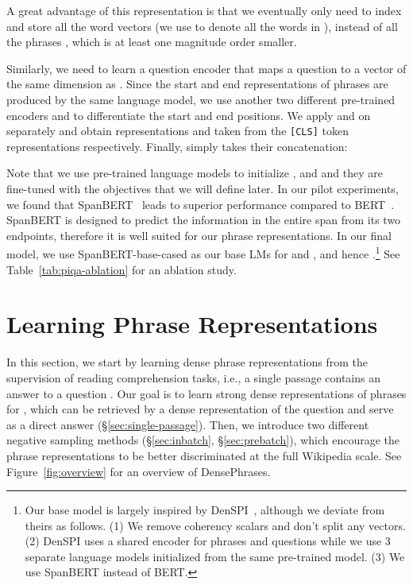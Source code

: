 \documentclass[11pt,a4paper]{article}
\newcommand{\ours}{DensePhrases}
\begin{document}
A great advantage of this representation is that we eventually only need to index and store all the word vectors (we use  to denote all the words in ), instead of all the phrases , which is at least one magnitude order smaller.



Similarly, we need to learn a question encoder  that maps a question  to a vector of the same dimension as . Since the start and end representations of phrases are produced by the same language model, we use another two different pre-trained encoders  and  to differentiate the start and end positions. We apply  and  on  separately and obtain representations  and  taken from the \texttt{[CLS]} token representations respectively. Finally,  simply takes their concatenation:
\vspace{-0.5em}

Note that we use pre-trained language models to initialize ,  and  and they are fine-tuned with the objectives that we will define later. In our pilot experiments, we found that SpanBERT~\citep{joshi2020spanbert} leads to superior performance compared to BERT~\cite{devlin2019bert}.
SpanBERT is designed to predict the information in the entire span from its two endpoints, therefore it is well suited for our phrase representations.
In our final model, we use SpanBERT-base-cased as our base LMs for  and , and hence .\footnote{Our base model is largely inspired by DenSPI~\cite{seo2019real}, although we deviate from theirs as follows. (1)
We remove coherency scalars and don't split any vectors.
(2) DenSPI uses a shared encoder for phrases and questions while we use 3 separate language models initialized from the same pre-trained model. (3) We use SpanBERT instead of BERT. } See Table~\ref{tab:piqa-ablation} for an ablation study.






\section{Learning Phrase Representations}
\label{sec:learning_phrases}

In this section, we start by learning dense phrase representations from the supervision of reading comprehension tasks, i.e., a single passage  contains an answer  to a question .
Our goal is to learn strong dense representations of phrases for , which can be retrieved by a dense representation of the question and serve as a direct answer (\S\ref{sec:single-passage}).
Then, we introduce two different negative sampling methods (\S\ref{sec:inbatch}, \S\ref{sec:prebatch}), which encourage the phrase representations to be better discriminated at the full Wikipedia scale.
See Figure~\ref{fig:overview} for an overview of \ours.
\end{document}
